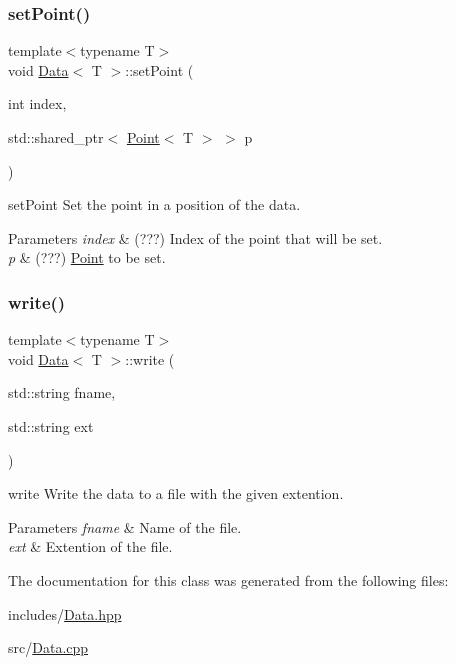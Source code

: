 \subsubsection{\texorpdfstring{set\+Point()}{setPoint()}}
{\footnotesize\ttfamily template$<$typename T$>$ \\
void \hyperlink{class_data}{Data}$<$ T $>$\+::set\+Point (\begin{DoxyParamCaption}\item[{int}]{index,  }\item[{std\+::shared\+\_\+ptr$<$ \hyperlink{class_point}{Point}$<$ T $>$ $>$}]{p }\end{DoxyParamCaption})}



set\+Point Set the point in a position of the data. 


\begin{DoxyParams}{Parameters}
{\em index} & (???) Index of the point that will be set. \\
\hline
{\em p} & (???) \hyperlink{class_point}{Point} to be set. \\
\hline
\end{DoxyParams}
\mbox{\label{class_data_a1f0bf8cc73e43cd6915289706abc46b2}} 
\subsubsection{\texorpdfstring{write()}{write()}}
{\footnotesize\ttfamily template$<$typename T$>$ \\
void \hyperlink{class_data}{Data}$<$ T $>$\+::write (\begin{DoxyParamCaption}\item[{std\+::string}]{fname,  }\item[{std\+::string}]{ext }\end{DoxyParamCaption})}



write Write the data to a file with the given extention. 


\begin{DoxyParams}{Parameters}
{\em fname} & Name of the file. \\
\hline
{\em ext} & Extention of the file. \\
\hline
\end{DoxyParams}


The documentation for this class was generated from the following files\+:\begin{DoxyCompactItemize}
\item 
includes/\hyperlink{_data_8hpp}{Data.\+hpp}\item 
src/\hyperlink{_data_8cpp}{Data.\+cpp}\end{DoxyCompactItemize}
